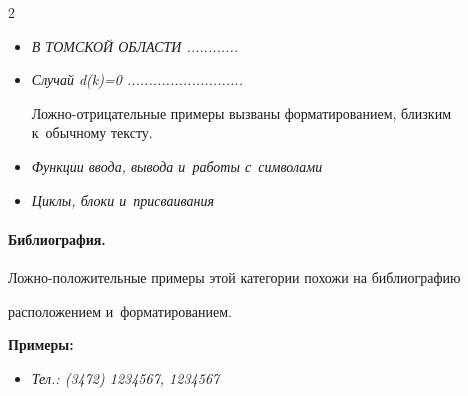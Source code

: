 \begin{multicols}{2}
\begin{itemize}
\item[$\bullet$]


\textit{В ТОМСКОЙ ОБЛАСТИ ............}





\item[$\bullet$]


\textit{Случай d(k)=0 ...........................}





Ложно-отрицательные примеры вызваны форматированием, близким к~обычному тексту.





\item[$\bullet$]


\textit{Функции ввода, вывода и~работы с~символами}





\item[$\bullet$]


\textit{Циклы, блоки и~присваивания}


\end{itemize}





\vspace*{-10pt}





\paragraph*{Библиография.}





Ложно-положительные примеры этой категории похожи на биб\-лио\-гра\-фию 


расположением и~форматированием.





\textbf{Примеры:}





\begin{itemize}


\item[$\bullet$]


\textit{Тел.: (3472) 1234567, 1234567}






\end{itemize}
\end{multicols}
